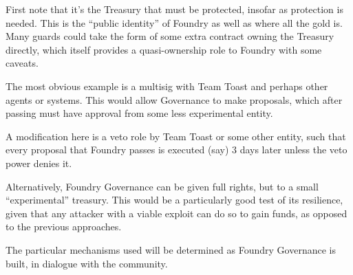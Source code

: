 \documentclass{article}
\begin{document}
First note that it's the Treasury that must be protected, insofar as protection is needed. This is the ``public identity'' of Foundry as well as where all the gold is. Many guards could take the form of some extra contract owning the Treasury directly, which itself provides a quasi-ownership role to Foundry with some caveats.

The most obvious example is a multisig with Team Toast and perhaps other agents or systems. This would allow Governance to make proposals, which after passing must have approval from some less experimental entity.

A modification here is a veto role by Team Toast or some other entity, such that every proposal that Foundry passes is executed (say) 3 days later unless the veto power denies it.

Alternatively, Foundry Governance can be given full rights, but to a small ``experimental'' treasury. This would be a particularly good test of its resilience, given that any attacker with a viable exploit can do so to gain funds, as opposed to the previous approaches.

The particular mechanisms used will be determined as Foundry Governance is built, in dialogue with the community.
\end{document}
